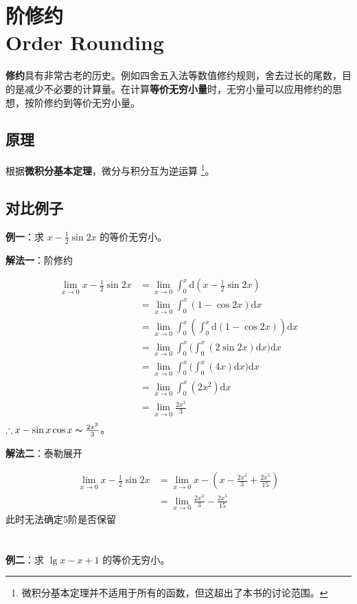 \chapter[阶修约]{阶修约 \\ Order Rounding}

\textbf{修约}具有非常古老的历史。例如四舍五入法等数值修约规则，舍去过长的尾数，目的是减少不必要的计算量。在计算\textbf{等价无穷小量}时，无穷小量可以应用修约的思想，按阶修约到等价无穷小量。

\section{原理}

根据\textbf{微积分基本定理}，微分与积分互为逆运算 \footnote{微积分基本定理并不适用于所有的函数，但这超出了本书的讨论范围。}。

\section{对比例子}

\textbf{例一}：求 $x - \frac{1}{2} \sin{2x}$ 的等价无穷小。

\textbf{解法一}：阶修约

\begin{equation}
\begin{aligned}
    \lim_{x\to 0} x - \frac{1}{2} \sin{2x}
    & = \lim_{x \to 0} \int_{0}^{x}{\mathrm{d}(x - \frac{1}{2} \sin{2x})} \\
    & = \lim_{x \to 0} \int_{0}^{x}{(1 - \cos{2x}) \mathrm{d}x}  \\
    & = \lim_{x \to 0} \int_{0}^{x}{(\int_{0}^{x}{ \mathrm{d}(1-\cos{2x})}) \mathrm{d}x} \\
    & = \lim_{x \to 0} \int_{0}^{x}{\Big(\int_{0}^{x} {(2 \sin{2x}) \mathrm{d}x}\Big)\mathrm{d}x} \\
    & = \lim_{x \to 0} \int_{0}^{x}{\Big(\int_{0}^{x} {(4x) \mathrm{d}x} \Big) \mathrm{d}x} \\
    & = \lim_{x\to 0} \int_{0}^{x}{(2x^2) \mathrm{d}x} \\
    & = \lim_{x\to 0} \frac{2x^3}{3} \\
\end{aligned}
\end{equation}
$\therefore x-\sin{x}\cos{x} \thicksim \frac{2x^3}{3}$。

\textbf{解法二}：泰勒展开

\begin{equation}
\begin{aligned}
    \lim_{x \to 0} x - \frac{1}{2} \sin{2x} 
    & = \lim_{x \to 0} {x - (x - \frac{2x^3}{3} + \frac{2x^5}{15})} \\
    & = \lim_{x \to 0} {\frac{2x^3}{3} - \frac{2x^5}{15}}
\end{aligned}
\end{equation}
此时无法确定5阶是否保留\\ %
\\
\\
\textbf{例二}：求 $\lg{x} - x + 1 $ 的等价无穷小。 %

